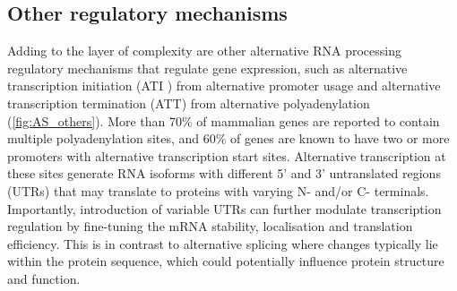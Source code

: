 \newpage
\subsection{Other regulatory mechanisms}
Adding to the layer of complexity are other alternative RNA processing regulatory mechanisms that regulate gene expression, such as alternative transcription initiation (ATI ) from alternative promoter usage and alternative transcription termination (ATT) from alternative polyadenylation (\cref{fig:AS_others}). More than 70\% of mammalian genes are reported to contain multiple polyadenylation sites, and 60\% of genes are known to have two or more promoters with alternative transcription start sites\cite{Carninci2006}. Alternative transcription at these sites generate RNA isoforms with different 5' and 3' untranslated regions (UTRs) that may translate to proteins with varying N- and/or C- terminals. Importantly, introduction of variable UTRs can further modulate transcription regulation by fine-tuning the mRNA stability, localisation and translation efficiency\cite{Reyes2018}. This is in contrast to alternative splicing where changes typically lie within the protein sequence, which could potentially influence protein structure and function.

